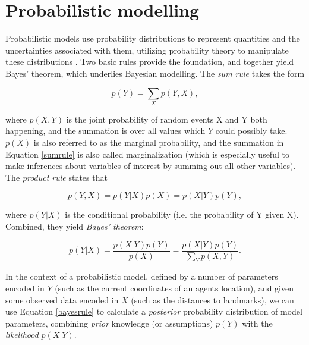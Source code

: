 

\section{Probabilistic modelling}

Probabilistic models use probability distributions to represent quantities and the uncertainties associated with them, utilizing probability theory to manipulate these distributions \citep{ghahramani2015probabilistic}. Two basic rules provide the foundation, and together yield Bayes' theorem, which underlies Bayesian modelling. The \textit{sum rule} takes the form

\begin{equation}
\label{sumrule}
p(Y) = \sum_{X} p(Y, X),
\end{equation}

where $p(X,Y)$ is the joint probability of random events X and Y both happening, and the summation is over all values which $Y$ could possibly take. $p(X)$ is also referred to as the marginal probability, and the summation in Equation \ref{sumrule} is also called marginalization (which is especially useful to make inferences about variables of interest by summing out all other variables). The \textit{product rule} states that

\begin{equation}
\label{productrule}
p(Y,X) = p(Y|X)p(X) = p(X|Y)p(Y),
\end{equation}

\noindent where $p(Y|X)$ is the conditional probability (i.e. the probability of Y given X). Combined, they yield \textit{Bayes' theorem}:

\begin{equation}
\label{bayesrule}
p(Y|X) = \frac{p(X|Y)p(Y)}{p(X)} = \frac{p(X|Y)p(Y)}{\sum_{Y} p(X, Y)}.
\end{equation}

In the context of a probabilistic model, defined by a number of parameters encoded in $Y$ (such as the current coordinates of an agents location), and given some observed data encoded in $X$ (such as the distances to landmarks), we can use Equation \ref{bayesrule} to calculate a \textit{posterior} probability distribution of model parameters, combining \textit{prior} knowledge (or assumptions) $p(Y)$ with the \textit{likelihood} $p(X|Y)$.


